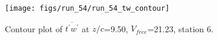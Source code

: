 \begin{figure}[H]
\centering
\texttt{[image: figs/run\_54/run\_54\_tw\_contour]}
\caption{Contour plot of $\overline{t^\prime w^\prime}$ at $z/c$=9.50, $V_{free}$=21.23, station 6.}
\end{figure}


